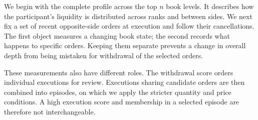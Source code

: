 \documentclass[11pt]{article}
\begin{document}
We begin with the complete profile across the top $n$ book levels. It describes how the participant's liquidity is distributed across ranks and between sides. We next fix a set of recent opposite-side orders at execution and follow their cancellations. The first object measures a changing book state; the second records what happens to specific orders. Keeping them separate prevents a change in overall depth from being mistaken for withdrawal of the selected orders.

These measurements also have different roles. The withdrawal score orders individual executions for review. Executions sharing candidate orders are then combined into episodes, on which we apply the stricter quantity and price conditions. A high execution score and membership in a selected episode are therefore not interchangeable.

\end{document}
